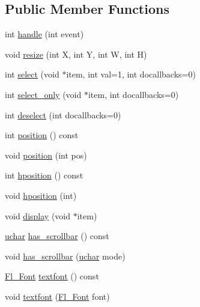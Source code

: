 \subsection*{Public Member Functions}
\begin{DoxyCompactItemize}
\item 
int \hyperlink{class_fl___browser___a63015169440ce8d6c979abcc2a27d359}{handle} (int event)
\item 
void \hyperlink{class_fl___browser___a3e9c0647239e6952aa0636ad7db72ada}{resize} (int X, int Y, int W, int H)
\item 
int \hyperlink{class_fl___browser___af3f96e34d2283d2e854b53335e6ee85a}{select} (void $\ast$item, int val=1, int docallbacks=0)
\item 
int \hyperlink{class_fl___browser___a7012b37539c19c46cef95dc7cb556199}{select\+\_\+only} (void $\ast$item, int docallbacks=0)
\item 
int \hyperlink{class_fl___browser___ab3a742edc19d5b7c5cb03a2e0b8fac58}{deselect} (int docallbacks=0)
\item 
int \hyperlink{class_fl___browser___aeaf7951678d13027e9b5ca73925bedad}{position} () const
\item 
void \hyperlink{class_fl___browser___ac88a0e4dc3feb727efc225a3f4f920be}{position} (int pos)
\item 
int \hyperlink{class_fl___browser___ae312c07fc6eee01f42eae60c85594889}{hposition} () const
\item 
void \hyperlink{class_fl___browser___a6bf164ef525549ed6bc12e29045ef15c}{hposition} (int)
\item 
void \hyperlink{class_fl___browser___a4017241fa506a2f38acc06704a383fde}{display} (void $\ast$item)
\item 
\hyperlink{fl__types_8h_a65f85814a8290f9797005d3b28e7e5fc}{uchar} \hyperlink{class_fl___browser___a67d0ca392fbc14371277661a4ab75fc7}{has\+\_\+scrollbar} () const
\item 
void \hyperlink{class_fl___browser___abad9f952fd007be8afcd1e3ca7ea1b86}{has\+\_\+scrollbar} (\hyperlink{fl__types_8h_a65f85814a8290f9797005d3b28e7e5fc}{uchar} mode)
\item 
\hyperlink{_enumerations_8_h_a2ac46d9f082834b969fffe490a03a709}{Fl\+\_\+\+Font} \hyperlink{class_fl___browser___a2963aa5fdbdba4f300a6ae328e31dd13}{textfont} () const
\item 
void \hyperlink{class_fl___browser___aea733233102940a15e5f31b9e3ba3ec9}{textfont} (\hyperlink{_enumerations_8_h_a2ac46d9f082834b969fffe490a03a709}{Fl\+\_\+\+Font} font)

\end{DoxyCompactItemize}

